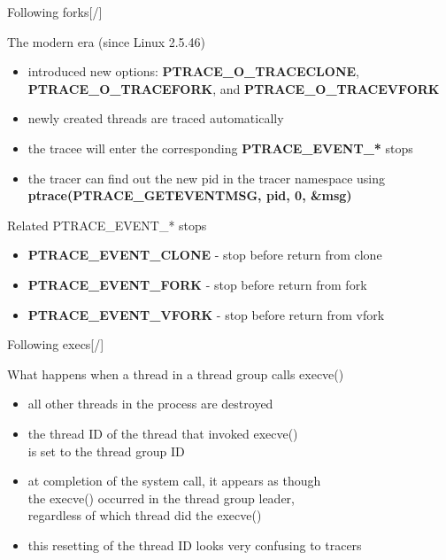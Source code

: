 \documentclass[unicode,aspectratio=169,xcolor={table,dvipsnames,usernames}]{beamer}
\begin{document}
\begin{frame}{\Large Following forks\hfill [\insertframenumber/\inserttotalframenumber]}
\large
\begin{block}{The modern era (since Linux 2.5.46)}
\begin{itemize}
	\item introduced new options:
		\textbf{PTRACE\_O\_TRACECLONE}, \textbf{PTRACE\_O\_TRACEFORK},
		and \textbf{PTRACE\_O\_TRACEVFORK}
	\item newly created threads are traced automatically
	\item the tracee will enter the corresponding \textbf{PTRACE\_EVENT\_*} stops
	\item the tracer can find out the new pid in the tracer namespace using
		\textbf{ptrace(PTRACE\_GETEVENTMSG, pid, 0, \&msg)} \\
\end{itemize}
\end{block}

\begin{block}{Related PTRACE\_EVENT\_* stops}
\begin{itemize}
	\item \textbf{PTRACE\_EVENT\_CLONE} - stop before return from clone
	\item \textbf{PTRACE\_EVENT\_FORK} - stop before return from fork
	\item \textbf{PTRACE\_EVENT\_VFORK} - stop before return from vfork
\end{itemize}
\end{block}
\end{frame}

\begin{frame}{\Large Following execs\hfill [\insertframenumber/\inserttotalframenumber]}
\Large
\begin{block}{What happens when a thread in a thread group calls execve()}
\begin{itemize}
	\item all other threads in the process are destroyed
	\item the thread ID of the thread that invoked execve() \\
		is set to the thread group ID
	\item at completion of the system call, it appears as though \\
		the execve() occurred in the thread group leader, \\
		regardless of which thread did the execve()
	\item this resetting of the thread ID looks very confusing to tracers
\end{itemize}
\end{block}
\end{frame}
\end{document}
